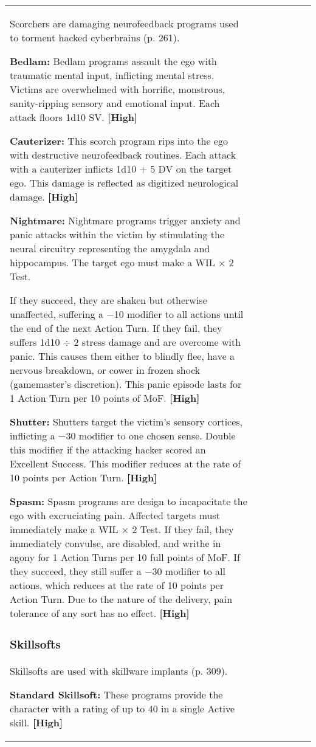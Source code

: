 \begin{tabular}{|l|l|l|l|l|l|l|}
Scorchers are damaging neurofeedback programs used to torment hacked cyberbrains (p. 261). 

\textbf{Bedlam:} Bedlam programs assault the ego with traumatic mental input, inflicting mental stress. Victims are overwhelmed with horrific, monstrous, sanity-ripping sensory and emotional input. Each attack floors 1d10 SV. \textbf{[High]} 

\textbf{Cauterizer:} This scorch program rips into the ego with destructive neurofeedback routines. Each attack with a cauterizer inflicts 1d10 + 5 DV on the target ego. This damage is reflected as digitized neurological damage. \textbf{[High]} 

\textbf{Nightmare:} Nightmare programs trigger anxiety and panic attacks within the victim by stimulating the neural circuitry representing the amygdala and hippocampus. The target ego must make a WIL $\times$ 2 Test. 

If they succeed, they are shaken but otherwise unaffected, suffering a $-$10 modifier to all actions until the end of the next Action Turn. If they fail, they suffers 1d10 $\div$ 2 stress damage and are overcome with panic. This causes them either to blindly flee, have a nervous breakdown, or cower in frozen shock (gamemaster’s discretion). This panic episode lasts for 1 Action Turn per 10 points of MoF. \textbf{[High]} 

\textbf{Shutter:} Shutters target the victim’s sensory cortices, inflicting a $-$30 modifier to one chosen sense. Double this modifier if the attacking hacker scored an Excellent Success. This modifier reduces at the rate of 10 points per Action Turn. \textbf{[High]} 

\textbf{Spasm:} Spasm programs are design to incapacitate the ego with excruciating pain. Affected targets must immediately make a WIL $\times$ 2 Test. If they fail, they immediately convulse, are disabled, and writhe in agony for 1 Action Turns per 10 full points of MoF. If they succeed, they still suffer a $-$30 modifier to all actions, which reduces at the rate of 10 points per Action Turn. Due to the nature of the delivery, pain tolerance of any sort has no effect. \textbf{[High]} 

\subsubsection{Skillsofts} 

Skillsofts are used with skillware implants (p. 309). 

\textbf{Standard Skillsoft:} These programs provide the character with a rating of up to 40 in a single Active skill. \textbf{[High]} 


\end{tabular}
